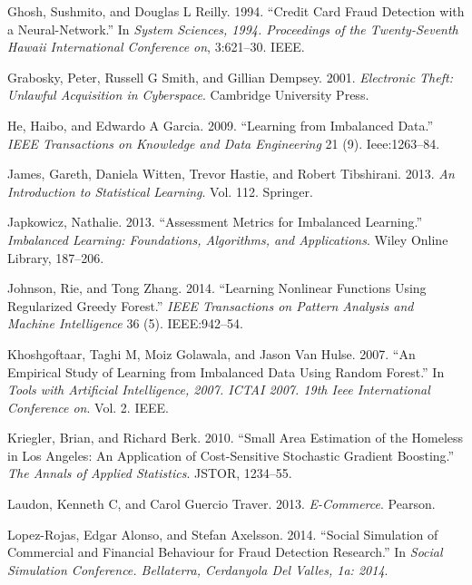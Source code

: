 \documentclass[12pt,]{article}
\begin{document}
\leavevmode\hypertarget{ref-ghosh1994credit}{}%
Ghosh, Sushmito, and Douglas L Reilly. 1994. ``Credit Card Fraud
Detection with a Neural-Network.'' In \emph{System Sciences, 1994.
Proceedings of the Twenty-Seventh Hawaii International Conference on},
3:621--30. IEEE.

\leavevmode\hypertarget{ref-grabosky2001electronic}{}%
Grabosky, Peter, Russell G Smith, and Gillian Dempsey. 2001.
\emph{Electronic Theft: Unlawful Acquisition in Cyberspace}. Cambridge
University Press.

\leavevmode\hypertarget{ref-he2009learning}{}%
He, Haibo, and Edwardo A Garcia. 2009. ``Learning from Imbalanced
Data.'' \emph{IEEE Transactions on Knowledge and Data Engineering} 21
(9). Ieee:1263--84.

\leavevmode\hypertarget{ref-james2013introduction}{}%
James, Gareth, Daniela Witten, Trevor Hastie, and Robert Tibshirani.
2013. \emph{An Introduction to Statistical Learning}. Vol. 112.
Springer.

\leavevmode\hypertarget{ref-japkowicz2013assessment}{}%
Japkowicz, Nathalie. 2013. ``Assessment Metrics for Imbalanced
Learning.'' \emph{Imbalanced Learning: Foundations, Algorithms, and
Applications}. Wiley Online Library, 187--206.

\leavevmode\hypertarget{ref-johnson2014learning}{}%
Johnson, Rie, and Tong Zhang. 2014. ``Learning Nonlinear Functions Using
Regularized Greedy Forest.'' \emph{IEEE Transactions on Pattern Analysis
and Machine Intelligence} 36 (5). IEEE:942--54.

\leavevmode\hypertarget{ref-khoshgoftaar2007empirical}{}%
Khoshgoftaar, Taghi M, Moiz Golawala, and Jason Van Hulse. 2007. ``An
Empirical Study of Learning from Imbalanced Data Using Random Forest.''
In \emph{Tools with Artificial Intelligence, 2007. ICTAI 2007. 19th Ieee
International Conference on}. Vol. 2. IEEE.

\leavevmode\hypertarget{ref-kriegler2010small}{}%
Kriegler, Brian, and Richard Berk. 2010. ``Small Area Estimation of the
Homeless in Los Angeles: An Application of Cost-Sensitive Stochastic
Gradient Boosting.'' \emph{The Annals of Applied Statistics}. JSTOR,
1234--55.

\leavevmode\hypertarget{ref-laudon2013commerce}{}%
Laudon, Kenneth C, and Carol Guercio Traver. 2013. \emph{E-Commerce}.
Pearson.

\leavevmode\hypertarget{ref-lopez2014social}{}%
Lopez-Rojas, Edgar Alonso, and Stefan Axelsson. 2014. ``Social
Simulation of Commercial and Financial Behaviour for Fraud Detection
Research.'' In \emph{Social Simulation Conference. Bellaterra,
Cerdanyola Del Valles, 1a: 2014}.
\end{document}
